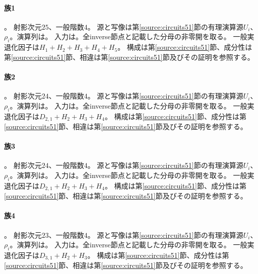 \paragraph{族1}\label{catalogue:T01}
。
射影次元$25$、一般階数$4$。
源と写像は第\ref{source:circuits51}節の有理演算源$U_i$、$\rho_i$。演算列は。
入力は。全inverse節点と記載した分母の非零開を取る。
一般実退化因子は$H_{1}+H_{2}+H_{3}+H_{4}+H_{5}$。
構成は第\ref{source:circuits51}節、成分性は第\ref{source:circuits51}節、相違は第\ref{source:circuits51}節及びその証明を参照する。

\paragraph{族2}\label{catalogue:T02}
。
射影次元$24$、一般階数$4$。
源と写像は第\ref{source:circuits51}節の有理演算源$U_i$、$\rho_i$。演算列は。
入力は。全inverse節点と記載した分母の非零開を取る。
一般実退化因子は$D_{2,1}+H_{2}+H_{3}+H_{4}$。
構成は第\ref{source:circuits51}節、成分性は第\ref{source:circuits51}節、相違は第\ref{source:circuits51}節及びその証明を参照する。

\paragraph{族3}\label{catalogue:T03}
。
射影次元$24$、一般階数$4$。
源と写像は第\ref{source:circuits51}節の有理演算源$U_i$、$\rho_i$。演算列は。
入力は。全inverse節点と記載した分母の非零開を取る。
一般実退化因子は$D_{2,1}+H_{2}+H_{3}+H_{4}$。
構成は第\ref{source:circuits51}節、成分性は第\ref{source:circuits51}節、相違は第\ref{source:circuits51}節及びその証明を参照する。

\paragraph{族4}\label{catalogue:T04}
。
射影次元$23$、一般階数$4$。
源と写像は第\ref{source:circuits51}節の有理演算源$U_i$、$\rho_i$。演算列は。
入力は。全inverse節点と記載した分母の非零開を取る。
一般実退化因子は$D_{3,1}+H_{2}+H_{3}$。
構成は第\ref{source:circuits51}節、成分性は第\ref{source:circuits51}節、相違は第\ref{source:circuits51}節及びその証明を参照する。

